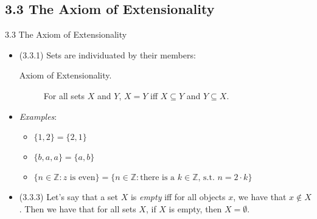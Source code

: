 \subsection{3.3 The Axiom of Extensionality}
\begin{frame}{3.3 The Axiom of Extensionality}

	\begin{itemize}
	
		\item (3.3.1) Sets are individuated by their members:
		
\begin{description}
	\item[Axiom of Extensionality.] For all sets $X$ and $Y$, $X=Y$ iff $X\subseteq Y$ and $Y\subseteq X$. 
\end{description}
		
	\item \emph{Examples}:
	
		\begin{itemize}
		
			\item $\{1,2\}=\{2,1\}$
			
			\item $\{b,a,a\}=\{a,b\}$
			
			\item $\{n\in\mathbb{Z}:z\text{ is even}\}=\{n\in\mathbb{Z}:\text{there is a }k\in \mathbb{Z}\text{, s.t. }n=2\cdot k\}$
		
		\end{itemize}
		
	\item (3.3.3) Let's say that a set $X$ is \emph{empty} iff for all objects $x$, we have that $x\notin X$. Then we have that for all sets $X$, if $X$ is empty, then $X=\emptyset$.

		
	\end{itemize}

\end{frame}

